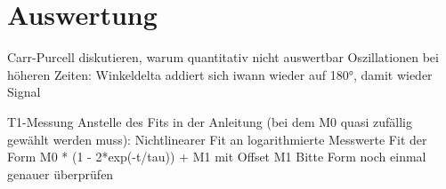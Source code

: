 \newpage
\section{Auswertung}
\label{sec:Auswertung}

Carr-Purcell diskutieren, warum quantitativ nicht auswertbar
Oszillationen bei höheren Zeiten: Winkeldelta addiert sich iwann
wieder auf 180°, damit wieder Signal

T1-Messung
Anstelle des Fits in der Anleitung (bei dem M0 quasi zufällig gewählt werden muss):
Nichtlinearer Fit an logarithmierte Messwerte
Fit der Form M0 * (1 - 2*exp(-t/tau)) + M1
mit Offset M1
Bitte Form noch einmal genauer überprüfen


